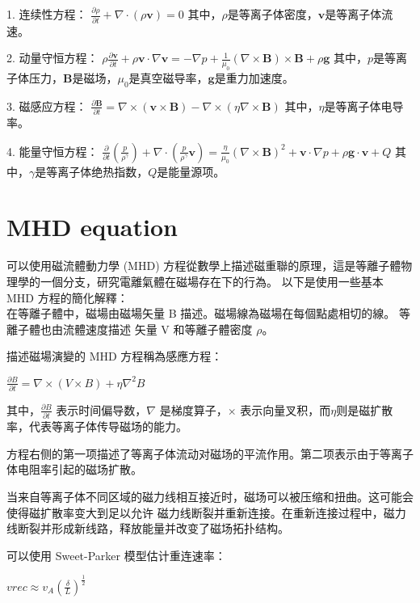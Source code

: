 \documentclass[12pt, a4paper, oneside]{article}
\begin{document}
\begin{spacing}{2.0}
1. 连续性方程：
$\displaystyle \frac{\partial \rho}{\partial t} + \nabla \cdot (\rho \mathbf{v}) = 0$
其中，$\rho$是等离子体密度，$\mathbf{v}$是等离子体流速。

2. 动量守恒方程：
$\displaystyle \rho \frac{\partial \mathbf{v}}{\partial t} + \rho \mathbf{v} \cdot \nabla \mathbf{v} = -\nabla p + \frac{1}{\mu_0}(\nabla \times \mathbf{B}) \times \mathbf{B} + \rho \mathbf{g}$
其中，$p$是等离子体压力，$\mathbf{B}$是磁场，$\mu_0$是真空磁导率，$\mathbf{g}$是重力加速度。

3. 磁感应方程：
$\displaystyle \frac{\partial \mathbf{B}}{\partial t} = \nabla \times (\mathbf{v} \times \mathbf{B}) - \nabla \times (\eta \nabla \times \mathbf{B})$
其中，$\eta$是等离子体电导率。

4. 能量守恒方程：
$\displaystyle \frac{\partial}{\partial t} (\frac{p}{\rho^\gamma}) + \nabla \cdot (\frac{p}{\rho^\gamma} \mathbf{v}) = \frac{\eta}{\mu_0} (\nabla \times \mathbf{B})^2 + \mathbf{v} \cdot \nabla p + \rho \mathbf{g} \cdot \mathbf{v} + Q$
其中，$\gamma$是等离子体绝热指数，$Q$是能量源项。

\section{MHD equation}

可以使用磁流體動力學 (MHD) 方程從數學上描述磁重聯的原理，這是等離子體物理學的一個分支，研究電離氣體在磁場存在下的行為。
以下是使用一些基本 MHD 方程的簡化解釋：\\
在等離子體中，磁場由磁場矢量 B 描述。磁場線為磁場在每個點處相切的線。 等離子體也由流體速度描述
矢量 V 和等離子體密度 $\rho$。

描述磁場演變的 MHD 方程稱為感應方程：\begin{center}
    $\displaystyle\frac{\partial B}{\partial t} = \nabla\times (V\times B) + \eta \nabla^2 B$
\end{center}

其中，$\displaystyle\frac{\partial B}{\partial t}$ 表示时间偏导数，$\nabla$ 是梯度算子，$\times$ 表示向量叉积，而$\eta$则是磁扩散率，代表等离子体传导磁场的能力。

方程右侧的第一项描述了等离子体流动对磁场的平流作用。第二项表示由于等离子体电阻率引起的磁场扩散。

当来自等离子体不同区域的磁力线相互接近时，磁场可以被压缩和扭曲。这可能会使得磁扩散率变大到足以允许
磁力线断裂并重新连接。在重新连接过程中，磁力线断裂并形成新线路，释放能量并改变了磁场拓扑结构。

可以使用 Sweet-Parker 模型估计重连速率：
\begin{center}
    $\displaystyle vrec \approx v_A(\frac{\delta}{L})^{\frac{1}{2}}$
\end{center}


\end{spacing}
\end{document}
